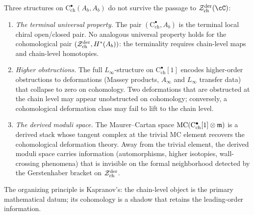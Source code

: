 \begin{remark}
\label{rem:chain-vs-cohomology}
Three structures on\/
$\mathrm{C}^\bullet_{\mathrm{ch}}(A_b, A_b)$ do not survive
the passage to\/ $\cZ^{\mathrm{der}}_{\mathrm{ch}}(\cC)$:
\begin{enumerate}[label=\textup{(\alph*)}]
\item \emph{The terminal universal property.}
 The pair $(\mathrm{C}^\bullet_{\mathrm{ch}}, A_b)$ is the
 terminal local chiral open/closed pair. No analogous
 universal property holds for the cohomological pair
 $(\mathcal{Z}^{\mathrm{der}}_{\mathrm{ch}}, H^*(A_b))$: the
 terminality requires chain-level maps and chain-level
 homotopies.

\item \emph{Higher obstructions.}
 The full $L_\infty$-structure on
 $\mathrm{C}^\bullet_{\mathrm{ch}}[1]$ encodes higher-order
 obstructions to deformations
 \textup{(}Massey products, $A_\infty$ and $L_\infty$ transfer
 data\textup{)} that collapse to zero on cohomology. Two
 deformations that are obstructed at the chain level may appear
 unobstructed on cohomology; conversely, a cohomological
 deformation class may fail to lift to the chain level.

\item \emph{The derived moduli space.}
 The Maurer--Cartan space
 $\mathrm{MC}(\mathrm{C}^\bullet_{\mathrm{ch}}[1] \otimes \mathfrak{m})$
 is a derived stack whose tangent complex at the trivial MC
 element recovers the cohomological deformation theory. Away
 from the trivial element, the derived moduli space carries
 information
 \textup{(}automorphisms, higher isotopies, wall-crossing
 phenomena\textup{)} that is invisible on the formal
 neighborhood detected by the Gerstenhaber bracket on
 $\mathcal{Z}^{\mathrm{der}}_{\mathrm{ch}}$.
\end{enumerate}
The organizing principle is Kapranov's: the chain-level object
is the primary mathematical datum; its cohomology is a
shadow that retains the leading-order information.
\end{remark}

